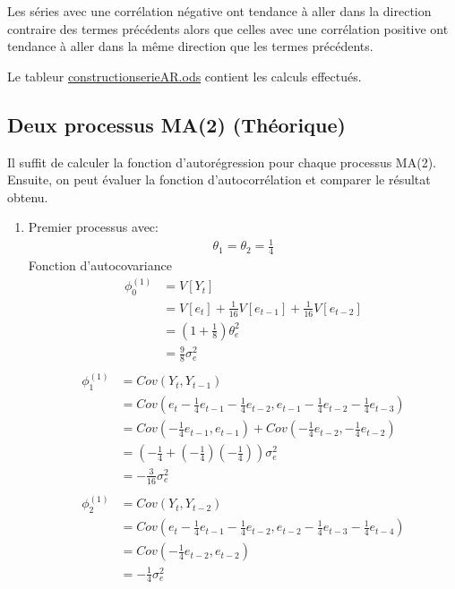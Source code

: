 \documentclass{article}
\begin{document}
Les séries avec une corrélation négative ont tendance à aller dans la direction contraire des termes précédents alors que celles avec une corrélation positive ont tendance à aller dans la même direction que les termes précédents.

Le tableur \url{constructionserieAR.ods} contient les calculs effectués.

\subsection{Deux processus MA(2) (Théorique)}

Il suffit de calculer la fonction d'autorégression pour chaque processus MA(2).
Ensuite, on peut évaluer la fonction d'autocorrélation et comparer le résultat obtenu.

\begin{enumerate}
\item Premier processus avec:
\begin{align*}
\theta_1 = \theta_2 = \frac{1}{4}
\end{align*}
Fonction d'autocovariance
\begin{align*}
\phi_0^{(1)} &= V[Y_t] \\
&= V[e_t]+\frac{1}{16}V[e_{t-1}]+\frac{1}{16}V[e_{t-2}] \\
&= (1+\frac{1}{8})\theta^2_e \\
&= \frac{9}{8} \sigma^2_e \\
\end{align*}
\begin{align*}
\phi_1^{(1)} &= Cov(Y_t,Y_{t-1}) \\
&= Cov(e_t - \frac{1}{4}e_{t-1} - \frac{1}{4}e_{t-2}, e_{t-1} - \frac{1}{4}e_{t-2} - \frac{1}{4}e_{t-3} )\\
&= Cov(-\frac{1}{4}e_{t-1},e_{t-1}) + Cov(-\frac{1}{4}e_{t-2},-\frac{1}{4}e_{t-2}) \\
&= (-\frac{1}{4}+(-\frac{1}{4})(-\frac{1}{4})) \sigma^2_e \\
&= -\frac{3}{16} \sigma^2_e \\
\end{align*}
\begin{align*}
\phi_2^{(1)} &= Cov(Y_t,Y_{t-2}) \\
&= Cov(e_t - \frac{1}{4}e_{t-1} - \frac{1}{4}e_{t-2}, e_{t-2} - \frac{1}{4}e_{t-3} - \frac{1}{4}e_{t-4} )\\
&= Cov(-\frac{1}{4}e_{t-2},e_{t-2}) \\
&= -\frac{1}{4} \sigma^2_e \\

\end{align*}
\end{enumerate}
\end{document}
